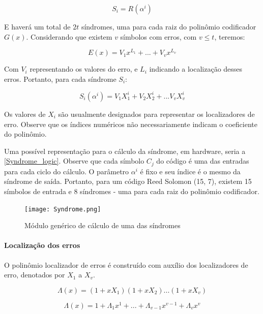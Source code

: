 	\begin{equation}
	S_{i} = R(\alpha^{i})
	\end{equation}
	
	E haverá um total de $2t$ síndromes, uma para cada raiz do polinômio codificador $G(x)$. Considerando que existem $v$ símbolos com erros, com $v \leq t$, teremos:
	
	\begin{equation}
	E(x) = V_{1}x^{L_{1}} + ... + V_{v}x^{L_{v}}
	\end{equation}
	
	Com $V_{i}$ representando os valores do erro, e $L_{i}$ indicando a localização desses erros. Portanto, para cada síndrome $S_{i}$:
	
	\begin{equation}
	S_{i}(\alpha^{i}) = V_{1}X_{1}^{i} + V_{2}X_{2}^{i} + ... V_{v}X_{v}^{i}
	\end{equation}
	
	Os valores de $X_{i}$ são usualmente designados para representar os localizadores de erro. Observe que os índices numéricos não necessariamente indicam o coeficiente do polinômio.
	
	Uma possível representação para o cálculo da síndrome, em hardware, seria a \autoref{Syndrome_logic}. Observe que cada símbolo $C_{j}$ do código é uma das entradas para cada ciclo do cálculo. O parâmetro $\alpha^{i}$ é fixo e seu índice é o mesmo da síndrome de saída. Portanto, para um código Reed Solomon (15, 7), existem 15 símbolos de entrada e 8 síndromes - uma para cada raiz do polinômio codificador.
	
	\begin{figure}[!htb]
		\caption{\label{Syndrome_logic} Módulo genérico de cálculo de uma das síndromes}
		\centering
		\texttt{[image: Syndrome.png]}
	\end{figure}
	
	\paragraph{Localização dos erros}
	
	O polinômio localizador de erros é construído com auxílio dos localizadores de erro, denotados por $X_{1}$ a $X_{v}$.
	
	\begin{equation}
	\Lambda(x) = (1 + xX_{1})(1 + xX_{2})...(1 + xX_{v})
	\end{equation}
	
	\begin{equation}
	\Lambda(x) =  1 + \Lambda_{1}x^{1} + ... + \Lambda_{v-1}x^{v-1} + \Lambda_{v}x^{v}
	\end{equation}
	
